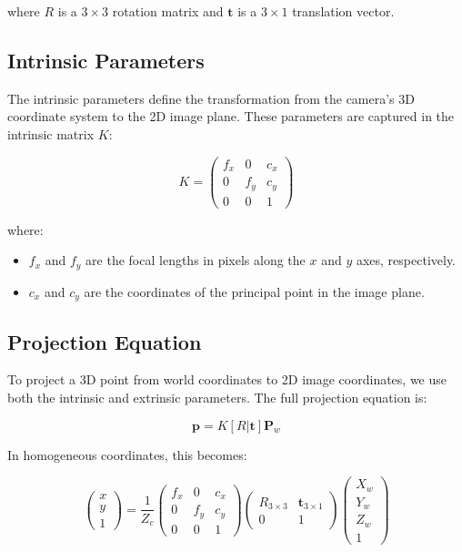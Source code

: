 where \(R\) is a \(3 \times 3\) rotation matrix and \(\mathbf{t}\) is a \(3 \times 1\) translation vector.

\subsection{Intrinsic Parameters}

The intrinsic parameters define the transformation from the camera's 3D coordinate system to the 2D image plane. These parameters are captured in the intrinsic matrix \(K\):

\[
K =
\begin{pmatrix}
	f_x & 0 & c_x \\
	0 & f_y & c_y \\
	0 & 0 & 1
\end{pmatrix}
\]

where:
\begin{itemize}
	\item \(f_x\) and \(f_y\) are the focal lengths in pixels along the \(x\) and \(y\) axes, respectively.
	\item \(c_x\) and \(c_y\) are the coordinates of the principal point in the image plane.
\end{itemize}

\subsection{Projection Equation}

To project a 3D point from world coordinates to 2D image coordinates, we use both the intrinsic and extrinsic parameters. The full projection equation is:

\[
\mathbf{p} = K [R | \mathbf{t}] \mathbf{P}_w
\]

In homogeneous coordinates, this becomes:

\[
\begin{pmatrix}
	x \\
	y \\
	1
\end{pmatrix}
=
\frac{1}{Z_c}
\begin{pmatrix}
	f_x & 0 & c_x \\
	0 & f_y & c_y \\
	0 & 0 & 1
\end{pmatrix}
\begin{pmatrix}
	R_{3 \times 3} & \mathbf{t}_{3 \times 1} \\
	0 & 1
\end{pmatrix}
\begin{pmatrix}
	X_w \\
	Y_w \\
	Z_w \\
	1
\end{pmatrix}
\]

